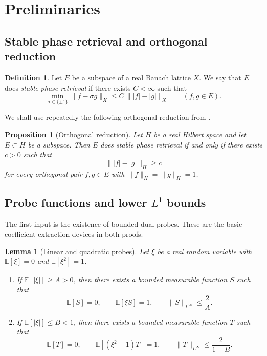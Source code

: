 \documentclass[11pt]{amsart}
\numberwithin{equation}{section}
\newtheorem{proposition}[theorem]{Proposition}
\newtheorem{lemma}[theorem]{Lemma}
\theoremstyle{definition}
\newtheorem{definition}[theorem]{Definition}
\theoremstyle{remark}
\newcommand{\E}{\mathbb E}
\newcommand{\abs}[1]{\lvert #1 \rvert}
\newcommand{\norm}[1]{\lVert #1 \rVert}
\begin{document}
\section{Preliminaries}\label{sec:preliminaries}

\subsection{Stable phase retrieval and orthogonal reduction}

\begin{definition}
Let $E$ be a subspace of a real Banach lattice $X$.  We say that $E$ does
\emph{stable phase retrieval} if there exists $C<\infty$ such that
\[
\min_{\sigma\in\{\pm1\}}\norm{f-\sigma g}_X
\le
C\,\norm{\abs{f}-\abs{g}}_X
\qquad(f,g\in E).
\]
\end{definition}

We shall use repeatedly the following orthogonal reduction from \cite{FOTP}.

\begin{proposition}[Orthogonal reduction]\label{prop:orth-reduction}
Let $H$ be a real Hilbert space and let $E\subset H$ be a subspace.  Then $E$
does stable phase retrieval if and only if there exists $c>0$ such that
\[
\norm{\abs{f}-\abs{g}}_H\ge c
\]
for every orthogonal pair $f,g\in E$ with $\norm{f}_H=\norm{g}_H=1$.
\end{proposition}

\subsection{Probe functions and lower $L^1$ bounds}

The first input is the existence of bounded dual probes.  These are the basic
coefficient-extraction devices in both proofs.

\begin{lemma}[Linear and quadratic probes]\label{lem:probes}
Let $\xi$ be a real random variable with $\E[\xi]=0$ and $\E[\xi^2]=1$.

\begin{enumerate}[label=\rm(\arabic*)]
\item If $\E[\abs{\xi}]\ge A>0$, then there exists a bounded measurable
function $S$ such that
\[
\E[S]=0,
\qquad
\E[\xi S]=1,
\qquad
\norm{S}_{L^\infty}\le \frac{2}{A}.
\]
\item If $\E[\abs{\xi}]\le B<1$, then there exists a bounded measurable
function $T$ such that
\[
\E[T]=0,
\qquad
\E[(\xi^2-1)T]=1,
\qquad
\norm{T}_{L^\infty}\le \frac{2}{1-B}.
\]
\end{enumerate}
\end{lemma}
\end{document}
